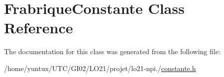 \hypertarget{class_frabrique_constante}{\section{\-Frabrique\-Constante \-Class \-Reference}
\label{class_frabrique_constante}
}


\-The documentation for this class was generated from the following file\-:\begin{DoxyCompactItemize}
\item 
/home/yuntux/\-U\-T\-C/\-G\-I02/\-L\-O21/projet/lo21-\/npi./\hyperlink{constante_8h}{constante.\-h}\end{DoxyCompactItemize}
